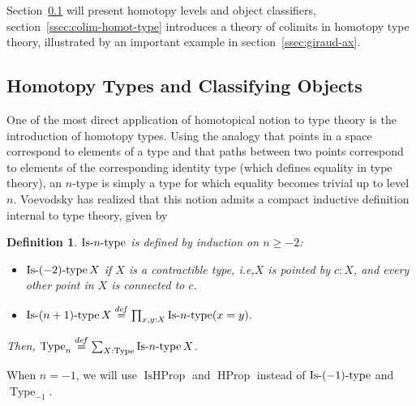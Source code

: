 \documentclass[preprint,9pt,numbers]{sigplanconf}
\newtheorem{defi}[thm]{Definition}
\newcommand \defeq {\overset{de\hspace{-0.2ex}f}{=}}
\newcommand{\mynote}[2]{
    \fbox{\bfseries\sffamily\scriptsize#1}
    {\small$\blacktriangleright$\textsf{\emph{#2}}$\blacktriangleleft$}~}
\newcommand\kq[1]{\mynote{KQ}{#1}}
\newcommand{\ie}{i.e,\xspace}
\DeclareMathOperator{\Type}{Type}
\DeclareMathOperator{\HProp}{HProp}
\DeclareMathOperator{\IsHProp}{IsHProp}
\DeclareMathOperator{\Contr}{Contr}
\DeclareMathOperator{\IsContr}{IsContr}
\def\mymathhyphen{{\hbox{-}}}
\newcommand{\IsType}[1]
{\mathop{\mathrm{Is\mymathhyphen}#1\mathrm{\mymathhyphen type}} }
\begin{document}
Section~\ref{ssec:hott} will present homotopy levels and object
classifiers, section~\ref{ssec:colim-homot-type} introduces a theory
of colimits in homotopy type theory, illustrated by an important
example in section~\ref{ssec:giraud-ax}.

 
 \subsection{Homotopy Types and Classifying Objects}
\label{ssec:hott}

One of the most direct application of homotopical notion to type
theory is the introduction of homotopy types. 
%
Using the analogy that points in a space correspond to elements of a
type and that paths between two points correspond to 
elements of the corresponding identity type (which defines equality in type theory),  
%
an $n$-type is simply a type
for which equality becomes trivial up to level $n$. 
%
Voevodsky has realized that this notion admits a compact inductive definition
internal to type theory, given by
\begin{defi}
  $\IsType n$ is defined by induction on $n\geqslant -2$:
  \begin{itemize}
  \item $\IsType {(-2)} X$ if $X$ is a contractible type, \ie $X$
    is pointed by $c:X$, and every other point in $X$ is connected to $c$.
  \item $\IsType {(n+1)} X \defeq \prod_{x,y:X} \IsType n (x=y).$
  \end{itemize}
  Then, $\Type_n \defeq \sum_{X:\Type} \IsType n X$.
\end{defi}
%
When $n=-1$, we will use $\IsHProp$ and $\HProp$ instead of
$\IsType{(-1)}$ and $\Type_{-1}$.

\end{document}
